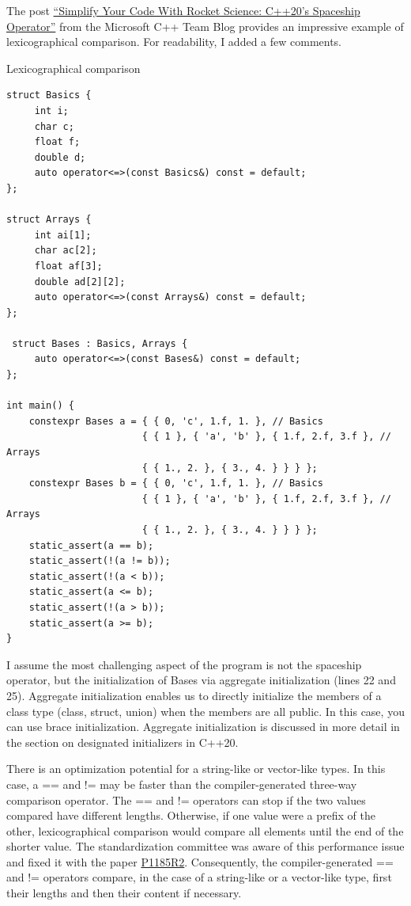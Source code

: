 The post \href{https://devblogs.microsoft.com/cppblog/simplify-your-code-with-rocket-science-c20s-spaceship-operator/}{“Simplify Your Code With Rocket Science: C++20’s Spaceship Operator”} from the Microsoft C++ Team Blog provides an impressive example of lexicographical comparison. For readability, I added a few comments.

\noindent
Lexicographical comparison
\begin{lstlisting}[style=styleCXX]
struct Basics {
	 int i;
	 char c;
	 float f;
	 double d;
	 auto operator<=>(const Basics&) const = default;
};

struct Arrays {
	 int ai[1];
	 char ac[2];
	 float af[3];
	 double ad[2][2];
	 auto operator<=>(const Arrays&) const = default;
};

 struct Bases : Basics, Arrays {
	 auto operator<=>(const Bases&) const = default;
};

int main() {
	constexpr Bases a = { { 0, 'c', 1.f, 1. }, // Basics
	 					{ { 1 }, { 'a', 'b' }, { 1.f, 2.f, 3.f }, // Arrays
						{ { 1., 2. }, { 3., 4. } } } };
	constexpr Bases b = { { 0, 'c', 1.f, 1. }, // Basics
	 					{ { 1 }, { 'a', 'b' }, { 1.f, 2.f, 3.f }, // Arrays
		 				{ { 1., 2. }, { 3., 4. } } } };
	static_assert(a == b);
	static_assert(!(a != b));
	static_assert(!(a < b));
	static_assert(a <= b);
	static_assert(!(a > b));
	static_assert(a >= b);
}
\end{lstlisting}

I assume the most challenging aspect of the program is not the spaceship operator, but the initialization of Bases via aggregate initialization (lines 22 and 25). Aggregate initialization enables us to directly initialize the members of a class type (class, struct, union) when the members are all public. In this case, you can use brace initialization. Aggregate initialization is discussed in more detail in the section on designated initializers in C++20.

\begin{tcolorbox}[colback=blue!5!white,colframe=blue!75!black,title={Optimized == and != Operators}]

There is an optimization potential for a string-like or vector-like types. In this case, a == and != may be faster than the compiler-generated three-way comparison operator. The == and != operators can stop if the two values compared have different lengths. Otherwise, if one value were a prefix of the other, lexicographical comparison would compare all elements until the end of the shorter value. The standardization committee was aware of this performance issue and fixed it with the paper \href{http://www.open-std.org/jtc1/sc22/wg21/docs/papers/2019/p1185r2.html}{P1185R2}. Consequently, the compiler-generated == and != operators compare, in the case of a string-like or a vector-like type, first their lengths and then their content if necessary.

\end{tcolorbox}


